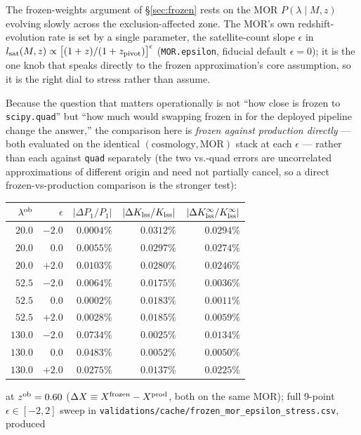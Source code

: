 \documentclass[a4paper, 11pt]{article}
\newcommand{\lob}{\lambda^{\rm ob}}
\newcommand{\zob}{z^{\rm ob}}
\newcommand{\Klss}{K_{\rm lss}}
\newcommand{\KlssInf}{K_{\rm lss}^{\infty}}
\begin{document}
The frozen-weights argument of \S\ref{sec:frozen} rests on the MOR
$P(\lambda\mid M,z)$ evolving slowly across the exclusion-affected
zone. The MOR's own redshift-evolution rate is set by a single
parameter, the satellite-count slope $\epsilon$ in
$l_{\rm sat}(M,z)\propto\big[(1+z)/(1+z_{\rm pivot})\big]^{\epsilon}$
(\texttt{MOR.epsilon}, fiducial default $\epsilon=0$); it is the one
knob that speaks directly to the frozen approximation's core
assumption, so it is the right dial to stress rather than assume.

Because the question that matters operationally is not ``how close
is frozen to \texttt{scipy.quad}'' but ``how much would swapping
frozen in for the deployed pipeline change the answer,'' the
comparison here is \emph{frozen against production directly} ---
both evaluated on the identical $(\text{cosmology},\text{MOR})$
stack at each $\epsilon$ --- rather than each against \texttt{quad}
separately (the two vs.-quad errors are uncorrelated approximations
of different origin and need not partially cancel, so a direct
frozen-vs-production comparison is the stronger test):
\begin{center}
\small
\begin{tabular}{r r r r r}
\toprule
$\lob$ & $\epsilon$ & $|\Delta P_1/P_1|$ & $|\Delta\Klss/\Klss|$ & $|\Delta\KlssInf/\KlssInf|$ \\
\midrule
$20.0$   & $-2.0$ & $0.0004\%$ & $0.0312\%$ & $0.0294\%$ \\
$20.0$   & $0.0$  & $0.0055\%$ & $0.0297\%$ & $0.0274\%$ \\
$20.0$   & $+2.0$ & $0.0103\%$ & $0.0280\%$ & $0.0246\%$ \\
$52.5$   & $-2.0$ & $0.0064\%$ & $0.0175\%$ & $0.0036\%$ \\
$52.5$   & $0.0$  & $0.0002\%$ & $0.0183\%$ & $0.0011\%$ \\
$52.5$   & $+2.0$ & $0.0028\%$ & $0.0185\%$ & $0.0059\%$ \\
$130.0$  & $-2.0$ & $0.0734\%$ & $0.0025\%$ & $0.0134\%$ \\
$130.0$  & $0.0$  & $0.0483\%$ & $0.0052\%$ & $0.0050\%$ \\
$130.0$  & $+2.0$ & $0.0275\%$ & $0.0137\%$ & $0.0225\%$ \\
\bottomrule
\end{tabular}
\end{center}
at $\zob=0.60$ ($\Delta X \equiv X^{\rm frozen}-X^{\rm prod}$, both
on the same MOR); full 9-point $\epsilon\in[-2,2]$ sweep in
\texttt{validations/cache/frozen\_mor\_epsilon\_stress.csv}, produced
\end{document}
